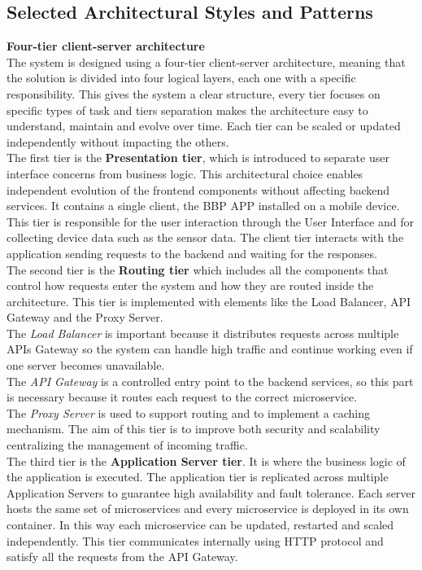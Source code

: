 \subsection{Selected Architectural Styles and Patterns}
\textbf{Four-tier client-server architecture}\\ 
The system is designed using a four-tier client-server architecture, meaning that the solution is divided into four logical layers, each one with a specific responsibility.
This gives the system a clear structure, every tier focuses on specific types of task and tiers separation makes the architecture easy to understand, maintain and evolve over time.
Each tier can be scaled or updated independently without impacting the others.
\\[5pt]
The first tier is the \textbf{Presentation tier}, which is introduced to separate user interface concerns from business logic. This architectural choice enables independent evolution of the frontend components without affecting backend services.
It contains a single client, the BBP APP installed on a mobile device. This tier is responsible for the user interaction through the User Interface and for collecting device data such as the sensor data. The client tier interacts with the application sending requests to the backend and waiting for the responses.
\\[5pt]
The second tier is the \textbf{Routing tier} which includes all the components that control how requests enter the system and how they are routed inside the architecture. This tier is implemented with elements like the Load Balancer, API Gateway and the Proxy Server. \\
The \textit{Load Balancer} is important because it distributes requests across multiple APIs Gateway so the system can handle high traffic and continue working even if one server becomes unavailable. \\
The \textit{API Gateway} is a controlled entry point to the backend services, so this part is necessary because it routes each request to the correct microservice. \\
The \textit{Proxy Server} is used to support routing and to implement a caching mechanism. The aim of this tier is to improve both security and scalability centralizing the management of incoming traffic. 
\\[5pt]
The third tier is the \textbf{Application Server tier}. It is where the business logic of the application is executed. The application tier is replicated across multiple Application Servers to guarantee high availability and fault tolerance. Each server hosts the same set of microservices and every microservice is deployed in its own container. In this way each microservice can be updated, restarted and scaled independently. This tier communicates internally using HTTP protocol and satisfy all the requests from the API Gateway.
